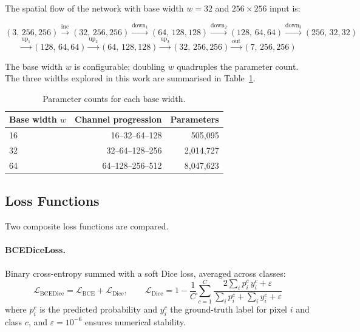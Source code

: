 The spatial flow of the network with base width $w=32$ and $256\times 256$ input is:

\[
(3,\,256,256)
\xrightarrow{\text{inc}}   (32,\,256,256)
\xrightarrow{\text{down}_1}(64,\,128,128)
\xrightarrow{\text{down}_2}(128,\,64,64)
\xrightarrow{\text{down}_3}(256,\,32,32)
\]
\[
\xrightarrow{\text{up}_1}  (128,\,64,64)
\xrightarrow{\text{up}_2}  (64,\,128,128)
\xrightarrow{\text{up}_3}  (32,\,256,256)
\xrightarrow{\text{out}}   (7,\,256,256)
\]

\noindent
The base width $w$ is configurable; doubling $w$ quadruples the parameter count. The three widths explored in this work are summarised in Table~\ref{tab:bw_params}.

\begin{table}[h]
\centering
\caption{Parameter counts for each base width.}
\label{tab:bw_params}
\begin{tabular}{lrr}
\toprule
Base width $w$ & Channel progression & Parameters \\
\midrule
16 & 16--32--64--128  &    505{,}095 \\
32 & 32--64--128--256 & 2{,}014{,}727 \\
64 & 64--128--256--512 & 8{,}047{,}623 \\
\bottomrule
\end{tabular}
\end{table}

\subsection{Loss Functions}
\label{sec:mr_loss}

Two composite loss functions are compared.

\paragraph{BCEDiceLoss.}
Binary cross-entropy summed with a soft Dice loss, averaged across classes:
\[
\mathcal{L}_{\text{BCEDice}} = \mathcal{L}_{\text{BCE}} + \mathcal{L}_{\text{Dice}},
\qquad
\mathcal{L}_{\text{Dice}} = 1 - \frac{1}{C}\sum_{c=1}^{C} \frac{2\sum_i p_i^c\, y_i^c + \varepsilon}{\sum_i p_i^c + \sum_i y_i^c + \varepsilon}
\]
where $p_i^c$ is the predicted probability and $y_i^c$ the ground-truth label for pixel $i$ and class $c$, and $\varepsilon=10^{-6}$ ensures numerical stability.

